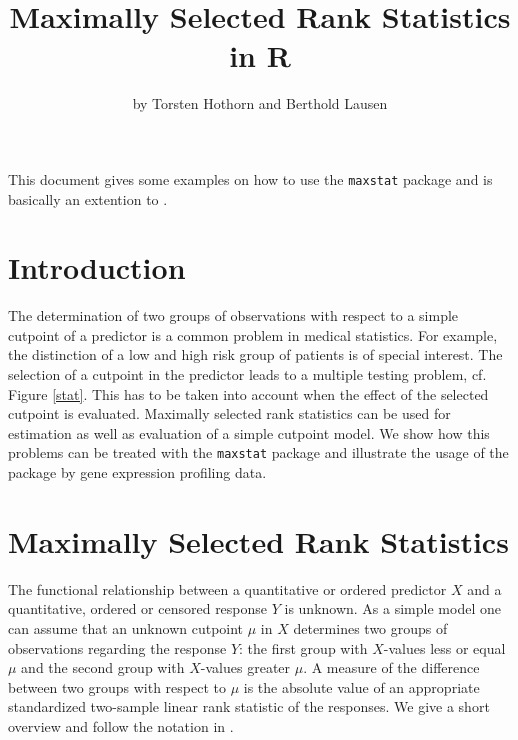 \documentclass{article}
\begin{document}
\title{Maximally Selected Rank Statistics in \textsf{R}}
\author{by Torsten Hothorn and Berthold Lausen}
\date{}

\maketitle

This document gives some examples on how to use the \texttt{maxstat} 
package and is basically an extention to \cite{on-maximal:2002}.


\section{Introduction}

The determination of two groups of observations with respect to a simple
cutpoint of a predictor is a common problem in medical statistics. For
example, the
distinction of a low and high risk group of patients is of special interest. 
The selection of a cutpoint in the predictor
leads to a multiple testing problem, cf. Figure \ref{stat}. This
has to be taken into account when the effect of the selected 
cutpoint is evaluated.
Maximally selected rank statistics can be used for estimation as well as
evaluation of a simple cutpoint model. We show how this problems can be
treated with the \texttt{maxstat} package and illustrate the usage of the
package by gene expression profiling data.

\section{Maximally Selected Rank Statistics}

The functional relationship between a quantitative or ordered predictor $X$
and a quantitative, ordered or censored response $Y$ is unknown. As a simple
model one can assume that an unknown cutpoint $\mu$ in $X$ determines two
groups of observations regarding the response $Y$: 
the first group with $X$-values less or equal $\mu$
and the second group with $X$-values greater $\mu$. A measure of the
difference between two groups with respect to $\mu$ is the absolute value of
an appropriate standardized two-sample linear rank statistic of the
responses. 
We give a short overview and follow the notation in \cite{maximally-:1992}.
\end{document}
